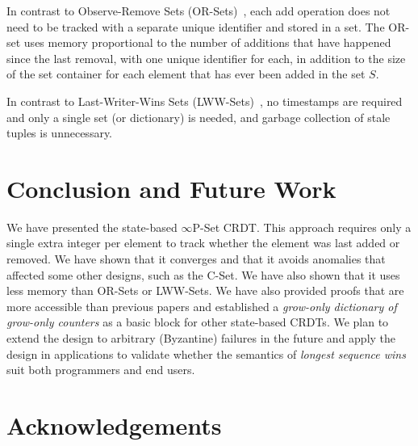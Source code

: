 \documentclass[10pt, oneside]{article}   	%
\begin{document}
In contrast to Observe-Remove Sets (OR-Sets)~\cite{shapiro:inria-00555588}, each add operation does not need to be tracked with a separate unique identifier and stored in a set. The OR-set uses memory proportional to the number of additions that have happened since the last removal, with one unique identifier for each, in addition to the size of the set container for each element that has ever been added in the set $S$.

In contrast to Last-Writer-Wins Sets (LWW-Sets)~\cite{shapiro:inria-00555588}, no timestamps are required and only a single set (or dictionary) is needed, and garbage collection of stale tuples is unnecessary.

%
%
%

%

\section{Conclusion and Future Work}
\label{sec:conclusion}

We have presented the state-based $\infty$P-Set CRDT. This approach requires only a single extra integer per element to track whether the element was last added or removed. We have shown that it converges and that it avoids anomalies that affected some other designs, such as the C-Set. We have also shown that it uses less memory than OR-Sets or LWW-Sets. We have also provided proofs that are more accessible than previous papers and established a \textit{grow-only dictionary of grow-only counters} as a basic block for other state-based CRDTs. We plan to extend the design to arbitrary (Byzantine) failures in the future and apply the design in applications to validate whether the semantics of \textit{longest sequence wins} suit both programmers and end users.

\section{Acknowledgements}
\label{sec:acknowledgements}
\end{document}
